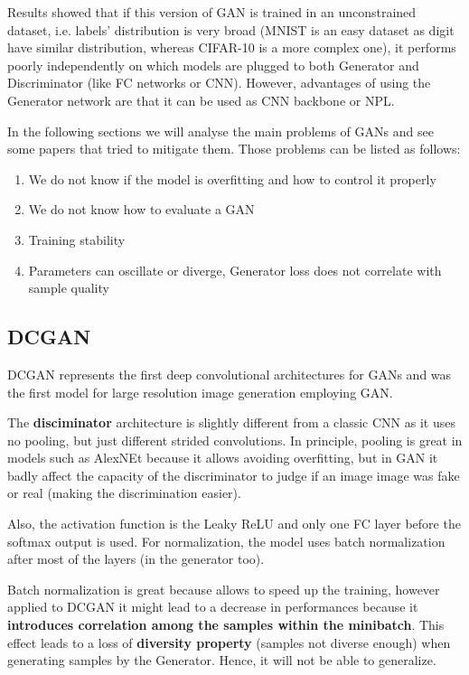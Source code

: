 Results showed that if this version of GAN is trained in an unconstrained dataset, i.e. labels' distribution is very broad (MNIST is an easy dataset as digit have similar distribution, whereas CIFAR-10 is a more complex one), it performs poorly independently on which models are plugged to both Generator and Discriminator (like FC networks or CNN). However, advantages of using the Generator network are that it can be used as CNN backbone or NPL.

In the following sections we will analyse the main problems of GANs and see some papers that tried to mitigate them. Those problems can be listed as follows:

\begin{enumerate}
    \item We do not know if the model is overfitting and how to control it properly
    \item We do not know how to evaluate a GAN
    \item Training stability 
    \item Parameters can oscillate or diverge, Generator loss does not correlate with sample quality
\end{enumerate}



\subsection{DCGAN}




DCGAN represents the first deep convolutional architectures for GANs and was the first model for large resolution image generation employing GAN.

The \textbf{disciminator} architecture is slightly different from a classic CNN as it uses no pooling, but just different strided convolutions. In principle, pooling is great in models such as AlexNEt because it allows avoiding overfitting, but in GAN it badly affect the capacity of the discriminator to judge if an image image was fake or real (making the discrimination easier).

Also, the activation function is the  Leaky ReLU and only one FC layer before the softmax output is used. For normalization, the model uses batch normalization after most of the layers (in the generator too). 


Batch normalization is great because allows to speed up the training, however applied to DCGAN it might lead to a decrease in performances because it \textbf{introduces correlation among the samples within the minibatch}. This effect leads to a loss of \textbf{diversity property} (samples not diverse enough) when generating samples by the Generator. Hence, it will not be able to generalize.



